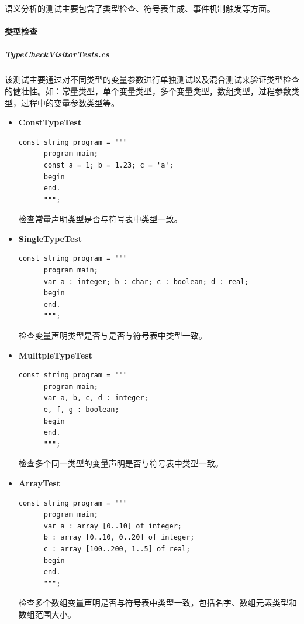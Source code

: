 \documentclass[../main.tex]{subfiles}
\begin{document}
语义分析的测试主要包含了类型检查、符号表生成、事件机制触发等方面。

\paragraph{类型检查}
\subparagraph{TypeCheckVisitorTests.cs}
该测试主要通过对不同类型的变量参数进行单独测试以及混合测试来验证类型检查的健壮性。如：常量类型，单个变量类型，多个变量类型，数组类型，过程参数类型，过程中的变量参数类型等。

\begin{itemize}
    \item \textbf{ConstTypeTest}
    \begin{lstlisting}[style=csharp]
const string program = """
      program main;
      const a = 1; b = 1.23; c = 'a';
      begin
      end.
      """;
    \end{lstlisting}

检查常量声明类型是否与符号表中类型一致。

    \item \textbf{SingleTypeTest}
    \begin{lstlisting}[style=csharp]
const string program = """
      program main;
      var a : integer; b : char; c : boolean; d : real;
      begin
      end.
      """;
    \end{lstlisting}

检查变量声明类型是否与是否与符号表中类型一致。

    \item \textbf{MulitpleTypeTest}
    \begin{lstlisting}[style=csharp]
const string program = """
      program main;
      var a, b, c, d : integer;
      e, f, g : boolean;
      begin
      end.
      """;        
    \end{lstlisting}

检查多个同一类型的变量声明是否与符号表中类型一致。

    \item \textbf{ArrayTest}
    \begin{lstlisting}[style=csharp]
const string program = """
      program main;
      var a : array [0..10] of integer;
      b : array [0..10, 0..20] of integer;
      c : array [100..200, 1..5] of real;
      begin
      end.
      """;
    \end{lstlisting}

检查多个数组变量声明是否与符号表中类型一致，包括名字、数组元素类型和数组范围大小。


\end{itemize}
\end{document}
